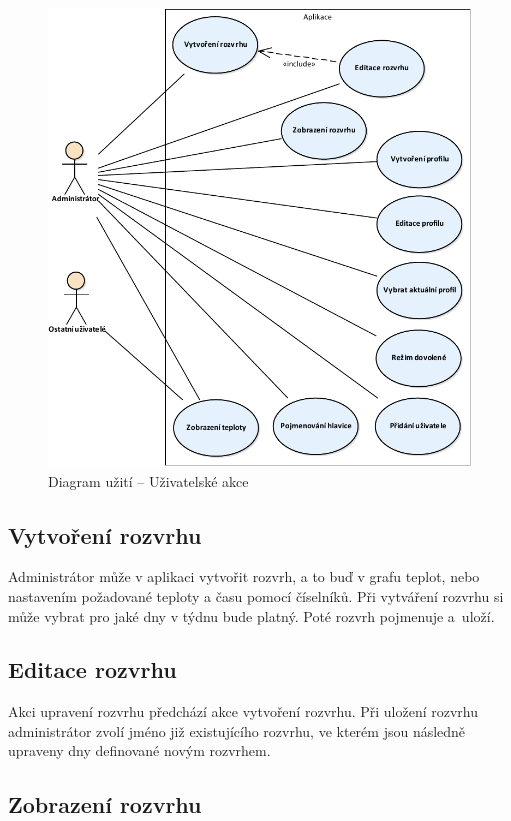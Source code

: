 \documentclass[thesis=B,czech]{FITthesis}[2012/10/20]
\begin{document}
\begin{figure}\centering
	\includegraphics[width=\textwidth]{diagrams/Uzivatele}
	\caption[Uživatelské akce]{Diagram užití -- Uživatelské akce}\label{fig:uzivatele}
\end{figure}

\subsection{Vytvoření rozvrhu}

Administrátor může v aplikaci vytvořit rozvrh, a to buď v grafu teplot, nebo nastavením požadované teploty a času pomocí číselníků. Při vytváření rozvrhu si může vybrat pro jaké dny v týdnu bude platný. Poté rozvrh pojmenuje a~uloží.

\subsection{Editace rozvrhu}

Akci upravení rozvrhu předchází akce vytvoření rozvrhu. Při uložení rozvrhu administrátor zvolí jméno již existujícího rozvrhu, ve kterém jsou následně upraveny dny definované novým rozvrhem.

\subsection{Zobrazení rozvrhu}
\end{document}
